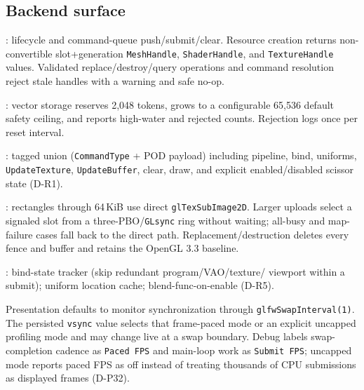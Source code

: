 \subsection{Backend surface}
: lifecycle and command-queue push/submit/clear. Resource
creation returns non-convertible slot+generation \texttt{MeshHandle},
\texttt{ShaderHandle}, and \texttt{TextureHandle} values. Validated
replace/destroy/query operations and command resolution reject stale handles
with a warning and safe no-op.

: vector storage reserves 2,048 tokens, grows to a
configurable 65,536 default safety ceiling, and reports high-water and rejected
counts. Rejection logs once per reset interval.

: tagged union (\texttt{CommandType} + POD payload)
including pipeline, bind, uniforms, \texttt{UpdateTexture}, \texttt{UpdateBuffer},
clear, draw, and explicit enabled/disabled scissor state (D-R1).

: rectangles through 64\,KiB use direct
\texttt{glTexSubImage2D}. Larger uploads select a signaled slot from a
three-PBO/\texttt{GLsync} ring without waiting; all-busy and map-failure cases
fall back to the direct path. Replacement/destruction deletes every fence and
buffer and retains the OpenGL 3.3 baseline.

: bind-state tracker (skip redundant program/VAO/texture/
viewport within a submit); uniform location cache; blend-func-on-enable (D-R5).

Presentation defaults to monitor synchronization through
\texttt{glfwSwapInterval(1)}. The persisted \texttt{vsync} value selects that
frame-paced mode or an explicit uncapped profiling mode and may change live at
a swap boundary. Debug labels swap-completion cadence as \texttt{Paced FPS} and
main-loop work as \texttt{Submit FPS}; uncapped mode reports paced FPS as off
instead of treating thousands of CPU submissions as displayed frames (D-P32).


